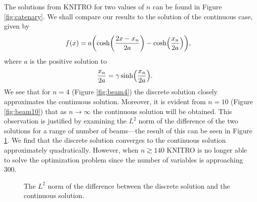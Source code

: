 \documentclass[11pt,a4paper,twocolumn]{article}
\let\originalleft\left
\let\originalright\right
\renewcommand{\left}{\mathopen{}\mathclose\bgroup\originalleft}
\renewcommand{\right}{\aftergroup\egroup\originalright}
\begin{document}
The solutions from KNITRO for two values of $n$ can be found in Figure \ref{fig:catenary}. We shall compare our results to the solution of the continuous case, given by
\begin{align}
	f(x) = a \left( \cosh \left( \frac{2x - x_n}{2a} \right) - \cosh \left( \frac{x_n}{2a} \right) \right),
\end{align}
where $a$ is the positive solution to
\begin{align}
	\frac{x_n}{2a} &= \gamma \sinh \left( \frac{x_n}{2a} \right).
\end{align}
We see that for $n = 4$ (Figure \ref{fig:beam4}) the discrete solution closely approximates the continuous solution. Moreover, it is evident from $n = 10$ (Figure \ref{fig:beam10}) that as $n \rightarrow \infty$ the continuous solution will be obtained. This observation is justified by examining the $L^2$ norm of the difference of the two solutions for a range of number of beams---the result of this can be seen in Figure \ref{fig:convergence}. We find that the discrete solution converges to the continuous solution approximately quadratically. However, when $n \gtrsim 140$ KNITRO is no longer able to solve the optimization problem since the number of variables is approaching $300$.

\begin{figure}[tbp]
	\centering
	
	\caption{The $L^2$ norm of the difference between the discrete solution and the continuous solution.}
	\label{fig:convergence}
\end{figure}

%
\end{document}
